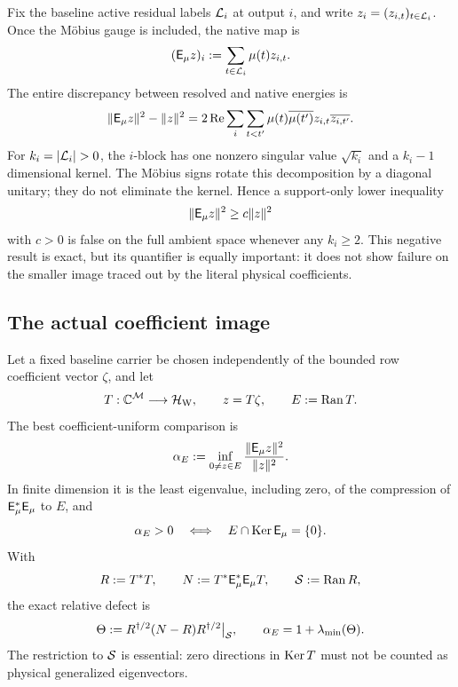 Fix the baseline active residual labels \(\mathcal L_i\) at output \(i\), and
write \(z_i=(z_{i,t})_{t\in\mathcal L_i}\).  Once the M\"obius gauge is included,
the native map is
\begin{equation}
 (\mathsf E_\mu z)_i:=\sum_{t\in\mathcal L_i}\mu(t)z_{i,t}.
 \label{eq:tpc58-intro-erasure}
\end{equation}
The entire discrepancy between resolved and native energies is
\begin{equation}
 \|\mathsf E_\mu z\|^2-\|z\|^2
 =2\operatorname{Re}\sum_i
   \sum_{t<t'}\mu(t)\overline{\mu(t')}
      z_{i,t}\overline{z_{i,t'}}.
 \label{eq:tpc58-intro-defect}
\end{equation}
For \(k_i=|\cL_i|>0\), the \(i\)-block has one nonzero singular value
\(\sqrt{k_i}\) and a \(k_i-1\) dimensional kernel.  The M\"obius signs
rotate this decomposition by a diagonal unitary; they do not eliminate
the kernel.  Hence a support-only lower inequality
\begin{equation}
 \|\mathsf E_\mu z\|^2\ge c\|z\|^2
 \label{eq:tpc58-intro-false-ambient}
\end{equation}
with \(c>0\) is false on the full ambient space whenever any \(k_i\ge2\).
This negative result is exact, but its quantifier is equally important:
it does not show failure on the smaller image traced out by the literal
physical coefficients.

\subsection{The actual coefficient image}

Let a fixed baseline carrier be chosen independently of the bounded row
coefficient vector \(\zeta\), and let
\begin{equation}
 T:\mathbb C^{\mathcal M}\longrightarrow\mathcal H_{\rm W},
 \qquad z=T\zeta,
 \qquad E:=\operatorname{Ran} T.
 \label{eq:tpc58-intro-T}
\end{equation}
The best coefficient-uniform comparison is
\begin{equation}
 \alpha_E
 :=\inf_{0\ne z\in E}
   \frac{\|\mathsf E_\mu z\|^2}{\|z\|^2}.
 \label{eq:tpc58-intro-alpha}
\end{equation}
In finite dimension it is the least eigenvalue, including zero, of the
compression of \(\mathsf E_\mu^*\mathsf E_\mu\) to \(E\), and
\begin{equation}
 \alpha_E>0
 \quad\Longleftrightarrow\quad
 E\cap\operatorname{Ker}\mathsf E_\mu=\{0\}.
 \label{eq:tpc58-intro-transversality}
\end{equation}
With
\begin{equation}
 R:=T^*T,
 \qquad N:=T^*\mathsf E_\mu^*\mathsf E_\mu T,
 \qquad \mathcal S:=\operatorname{Ran} R,
 \label{eq:tpc58-intro-two-Grams}
\end{equation}
the exact relative defect is
\begin{equation}
 \Theta:=R^{\dagger/2}(N-R)R^{\dagger/2}\big|_{\mathcal S},
 \qquad
 \alpha_E=1+\lambda_{\min}(\Theta).
 \label{eq:tpc58-intro-relative-defect}
\end{equation}
The restriction to \(\mathcal S\) is essential: zero directions in \(\operatorname{Ker} T\)
must not be counted as physical generalized eigenvectors.

